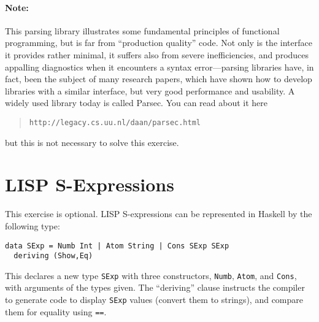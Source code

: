\documentclass{article}
\newcommand{\percents}[1]{\protect \marginpar[l]{\bf [#1 points]}}
\begin{document}
\paragraph{Note:} This parsing library illustrates some fundamental
principles of functional programming, but is far from ``production
quality'' code. Not only is the interface it provides rather minimal,
it suffers also from severe inefficiencies, and produces appalling
diagnostics when it encounters a syntax error---parsing libraries
have, in fact, been the subject of many research papers, which have
shown how to develop libraries with a similar interface, but very good
performance and usability. A widely used library today is
called Parsec. You can read about it here
\begin{quote}
\texttt{http://legacy.cs.uu.nl/daan/parsec.html}
\end{quote}
but this is not necessary to solve this exercise.


\section{LISP S-Expressions}
This exercise is optional.
\percents{0}
LISP S-expressions can be represented in Haskell by the following
type:
\begin{verbatim}
data SExp = Numb Int | Atom String | Cons SExp SExp
  deriving (Show,Eq)
\end{verbatim}
This declares a new type \texttt{SExp} with three constructors,
\texttt{Numb}, \verb!Atom!, and \verb!Cons!, with arguments of the types
given. The ``deriving'' clause instructs the compiler to generate code
to display \verb!SExp! values (convert them to strings), and compare
them for equality using \verb!==!.
\end{document}
